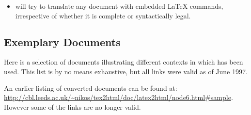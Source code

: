 \begin{itemize}
%
%

%
%
\item
will try to translate any document with embedded \LaTeX{} commands,
irrespective of whether it is complete or syntactically legal.

\end{itemize}


\subsection{Exemplary Documents\label{exemplary}}
Here is a selection of documents illustrating different contexts in
which \latextohtml{} has been used. This list is by no means exhaustive,
but all links were valid as of June 1997.

\medskip\noindent
An earlier listing of converted documents can be found at:
\url{http://cbl.leeds.ac.uk/~nikos/tex2html/doc/latex2html/node6.html#sample}.
However some of the links are no longer valid.

